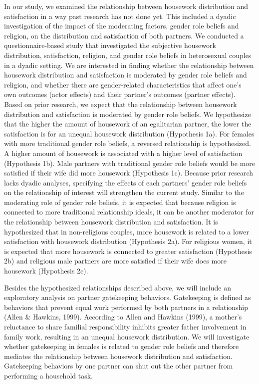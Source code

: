 \documentclass[
  man,floatsintext]{apa6}
\begin{document}
In our study, we examined the relationship between housework distribution and satisfaction in a way past research has not done yet. This included a dyadic investigation of the impact of the moderating factors, gender role beliefs and religion, on the distribution and satisfaction of both partners. We conducted a questionnaire-based study that investigated the subjective housework distribution, satisfaction, religion, and gender role beliefs in heterosexual couples in a dyadic setting. We are interested in finding whether the relationship between housework distribution and satisfaction is moderated by gender role beliefs and religion, and whether there are gender-related characteristics that affect one's own outcomes (actor effects) and their partner's outcomes (partner effects). Based on prior research, we expect that the relationship between housework distribution and satisfaction is moderated by gender role beliefs. We hypothesize that the higher the amount of housework of an egalitarian partner, the lower the satisfaction is for an unequal housework distribution (Hypothesis 1a). For females with more traditional gender role beliefs, a reversed relationship is hypothesized. A higher amount of housework is associated with a higher level of satisfaction (Hypothesis 1b). Male partners with traditional gender role beliefs would be more satisfied if their wife did more housework (Hypothesis 1c). Because prior research lacks dyadic analyses, specifying the effects of each partners' gender role beliefs on the relationship of interest will strengthen the current study. Similar to the moderating role of gender role beliefs, it is expected that because religion is connected to more traditional relationship ideals, it can be another moderator for the relationship between housework distribution and satisfaction. It is hypothesized that in non-religious couples, more housework is related to a lower satisfaction with housework distribution (Hypothesis 2a). For religious women, it is expected that more housework is connected to greater satisfaction (Hypothesis 2b) and religious male partners are more satisfied if their wife does more housework (Hypothesis 2c).

Besides the hypothesized relationships described above, we will include an exploratory analysis on partner gatekeeping behaviors. Gatekeeping is defined as behaviors that prevent equal work performed by both partners in a relationship (Allen \& Hawkins, 1999). According to Allen and Hawkins (1999), a mother's reluctance to share familial responsibility inhibits greater father involvement in family work, resulting in an unequal housework distribution. We will investigate whether gatekeeping in females is related to gender role beliefs and therefore mediates the relationship between housework distribution and satisfaction. Gatekeeping behaviors by one partner can shut out the other partner from performing a household task.
\end{document}
